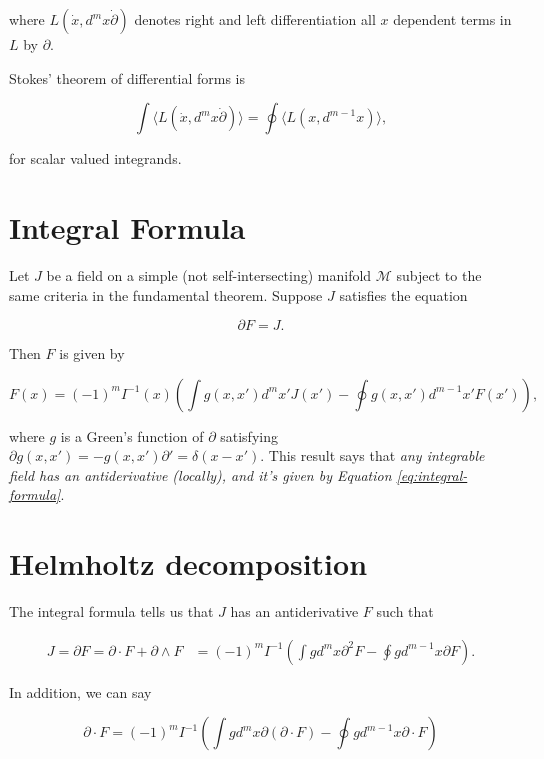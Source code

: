 \documentclass{article}
\begin{document}
where $L(\dot x, d^mx \dot \partial)$ denotes right and left differentiation all $x$ dependent terms in $L$ by $\partial$.

Stokes' theorem of differential forms is

\begin{equation}
  \int \langle L(\dot x, d^mx \dot \partial)\rangle = \oint \langle L(x, d^{m-1}x)\rangle,
\end{equation}

for scalar valued integrands.

\section{Integral Formula}

Let $J$ be a field on a simple (not self-intersecting) manifold $\mathcal{M}$ subject to the same criteria in the fundamental theorem. Suppose $J$ satisfies the equation

\begin{equation}
  \partial F = J.
\end{equation}

Then $F$ is given by \cite{cagc}

\begin{equation}
  F(x) = (-1)^m I^{-1}(x) \left(\int g(x, x') d^{m}x' J(x') - \oint g(x, x') d^{m-1}x' F(x')\right),\label{eq:integral-formula}
\end{equation}

where $g$ is a Green's function of $\partial$ satisfying $\partial g(x,x') = - g(x, x') \partial' = \delta(x - x').$ This result says that \emph{any integrable field has an antiderivative (locally), and it's given by Equation \ref{eq:integral-formula}}.

\section{Helmholtz decomposition}

The integral formula tells us that $J$ has an antiderivative $F$ such that

\begin{align}
  J = \partial F = \partial \cdot F + \partial \wedge F &= (-1)^m I^{-1} \left(\int g d^{m}x \partial^2 F - \oint g d^{m-1}x \partial F\right).\label{eq:helmholtz}
\end{align}

In addition, we can say

\begin{equation}
  \partial \cdot F = (-1)^m I^{-1} \left(\int g d^{m}x \partial (\partial \cdot F) - \oint g d^{m-1}x \partial \cdot F\right)
\end{equation}
\end{document}
